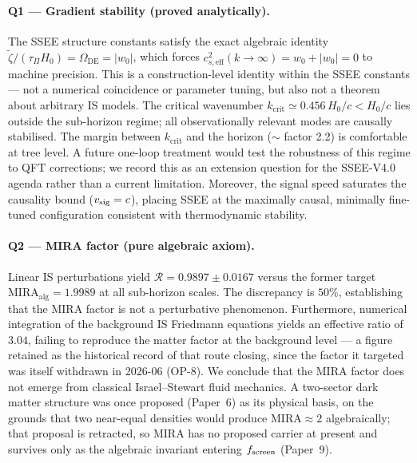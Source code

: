 \documentclass[12pt,a4paper]{article}
\newcommand{\wz}{w_0}
\newcommand{\OmDE}{\Omega_{\mathrm{DE}}}
\newcommand{\tauPi}{\tau_\Pi}
\newcommand{\ztilde}{\tilde{\zeta}}
\begin{document}
\paragraph{Q1 — Gradient stability (proved analytically).}
The SSEE structure constants satisfy the exact algebraic identity
$\ztilde/(\tauPi H_0) = \OmDE = |\wz|$, which forces
$c^2_{s,\mathrm{eff}}(k\to\infty) = \wz + |\wz| = 0$ to machine precision.
This is a construction-level identity within the SSEE constants — not a
numerical coincidence or parameter tuning, but also not a theorem about
arbitrary IS models. The critical wavenumber $k_\mathrm{crit} \simeq 0.456\,H_0/c < H_0/c$
lies outside the sub-horizon regime; all observationally relevant modes are
causally stabilised. The margin between $k_\mathrm{crit}$ and the horizon
($\sim$ factor 2.2) is comfortable at tree level. A future one-loop
treatment would test the robustness of this regime to QFT corrections;
we record this as an extension question for the SSEE-V4.0 agenda rather
than a current limitation.
Moreover, the signal speed saturates the causality bound ($v_{\rm sig} = c$),
placing SSEE at the maximally causal, minimally fine-tuned configuration
consistent with thermodynamic stability.

\paragraph{Q2 — MIRA factor (pure algebraic axiom).}
Linear IS perturbations yield
$\mathcal{R} = 0.9897 \pm 0.0167$ versus the former target
$\mathrm{MIRA}_{\mathrm{alg}} = 1.9989$ at all sub-horizon scales.
The discrepancy is $50\%$, establishing that the MIRA factor is not a
perturbative phenomenon.
Furthermore, numerical integration of the background IS Friedmann equations yields an effective ratio of $3.04$, failing to reproduce the matter factor at the background level --- a figure retained as the historical record of that route closing, since the factor it targeted was itself withdrawn in 2026-06 (OP-8).
We conclude that the MIRA factor does not emerge from classical Israel--Stewart fluid mechanics. A two-sector dark matter structure was once proposed (Paper~6) as its physical basis, on the grounds that two near-equal densities would produce $\mathrm{MIRA}\approx2$ algebraically; that proposal is retracted, so MIRA has no proposed carrier at present and survives only as the algebraic invariant entering $f_{\rm screen}$ (Paper~9).
\end{document}
